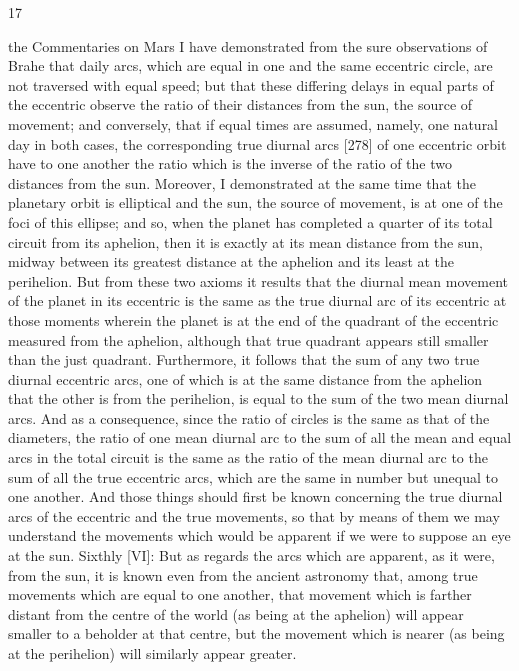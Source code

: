 \documentclass{article}
\begin{document}
17

the Commentaries on Mars I have demonstrated from the sure
observations of Brahe that daily arcs, which are equal in one and the
same eccentric circle, are not traversed with equal speed; but that these
differing delays in equal parts of the eccentric observe the ratio of their
distances from the sun, the source of movement; and conversely, that if
equal times are assumed, namely, one natural day in both cases, the
corresponding true diurnal arcs [278] of one eccentric orbit have to one
another the ratio which is the inverse of the ratio of the two distances
from the sun. Moreover, I demonstrated at the same time that the
planetary orbit is elliptical and the sun, the source of movement, is at
one of the foci of this ellipse; and so, when the planet has completed a
quarter of its total circuit from its aphelion, then it is exactly at its mean
distance from the sun, midway between its greatest distance at the
aphelion and its least at the perihelion. But from these two axioms it
results that the diurnal mean movement of the planet in its eccentric is
the same as the true diurnal arc of its eccentric at those moments
wherein the planet is at the end of the quadrant of the eccentric
measured from the aphelion, although that true quadrant appears still
smaller than the just quadrant. Furthermore, it follows that the sum of
any two true diurnal eccentric arcs, one of which is at the
same distance from the aphelion that the other is from the perihelion, is
equal to the sum of the two mean diurnal arcs. And as a
consequence, since the ratio of circles is the same as that of the
diameters, the ratio of one mean diurnal arc to the sum of all the mean
and equal arcs in the total circuit is the same as the ratio of the mean
diurnal arc to the sum of all the true eccentric arcs, which are the same
in number but unequal to one another. And those things should first be
known concerning the true diurnal arcs of the eccentric and the true
movements, so that by means of them we may understand the
movements which would be apparent if we were to suppose an eye at the
sun.
Sixthly [VI]: But as regards the arcs which are apparent, as it were, from
the sun, it is known even from the ancient astronomy that, among true
movements which are equal to one another, that movement which is
farther distant from the centre of the world (as being at the aphelion)
will appear smaller to a beholder at that centre, but the movement which
is nearer (as being at the perihelion) will similarly appear greater.
\end{document}

